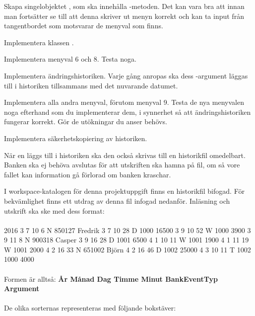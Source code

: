 \Task Skapa singelobjektet , som ska innehålla -metoden. Det kan vara bra att innan man fortsätter se till att denna skriver ut menyn korrekt och kan ta input från tangentbordet som motsvarar de menyval som finns.

\Task Implementera klassen .

\Subtask Implementera menyval 6 och 8. Testa noga.

\Subtask Implementera ändringshistoriken. Varje gång  anropas ska dess -argument läggas till i historiken tillsammans med det nuvarande datumet.

\Subtask Implementera alla andra menyval, förutom menyval 9. Testa de nya menyvalen noga efterhand som du implementerar dem, i synnerhet så att ändringshistoriken fungerar korrekt. Gör de utökningar du anser behövs.

\Task Implementera säkerhetskopiering av historiken.

\Subtask När en  läggs till i historiken ska den också skrivas till en historikfil omedelbart. Banken ska ej behöva avslutas för att utskriften ska hamna på fil, om så vore fallet kan information gå förlorad om banken kraschar.

I workspace-katalogen för denna projektuppgift finns en historikfil bifogad. För bekvämlighet finns ett utdrag av denna fil infogad nedanför. Inläsning och utskrift ska ske med dess format:\\~\\
2016 3 7 10 6 N 850127 Fredrik 3 7 10 28 D 1000 16500 3 9 10 52 W 1000 3900 3 9 11 8 N 900318 Casper 3 9 16 28 D 1001 6500 4 1 10 11 W 1001 1900 4 1 11 19 W 1001 2000 4 2 16 33 N 651002 Björn 4 2 16 46 D 1002 25000 4 3 10 11 T 1002 1000 4000\\~\\
Formen är alltså: \textbf{År  Månad  Dag  Timme  Minut  BankEventTyp  Argument}
\\~\\
De olika sorternas  representeras med följande bokstäver:

